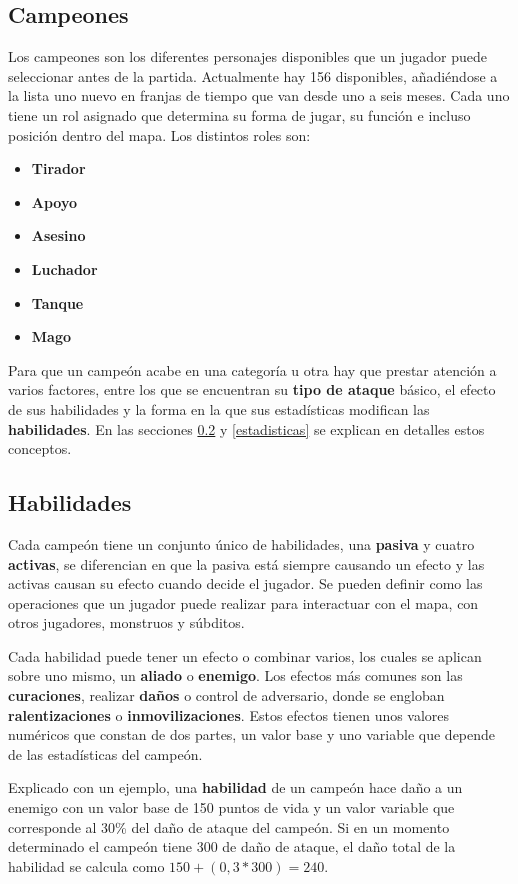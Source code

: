 \subsection{Campeones}
Los campeones son los diferentes personajes disponibles que un jugador puede seleccionar antes de la partida. Actualmente hay 156 disponibles, añadiéndose a la lista uno nuevo en franjas de tiempo que van desde uno a seis meses. Cada uno tiene un rol asignado que determina su forma de jugar, su función e incluso posición dentro del mapa. Los distintos roles son:
\begin{itemize}
	\tightlist
	\item \textbf{Tirador}
	\item \textbf{Apoyo}
	\item \textbf{Asesino}
	\item \textbf{Luchador}
	\item \textbf{Tanque}
	\item \textbf{Mago}
\end{itemize}

Para que un campeón acabe en una categoría u otra hay que prestar atención a varios factores, entre los que se encuentran su \textbf{tipo de ataque} básico, el efecto de sus habilidades y la forma en la que sus estadísticas modifican las \textbf{habilidades}. En las secciones \ref{habilidades} y \ref{estadisticas} se explican en detalles estos conceptos.

\subsection{Habilidades}
\label{habilidades}
Cada campeón tiene un conjunto único de habilidades, una \textbf{pasiva} y cuatro \textbf{activas}, se diferencian en que la pasiva está siempre causando un efecto y las activas causan su efecto cuando decide el jugador. Se pueden definir como las operaciones que un jugador puede realizar para interactuar con el mapa, con otros jugadores, monstruos y súbditos.

Cada habilidad puede tener un efecto o combinar varios, los cuales se aplican sobre uno mismo, un \textbf{aliado} o \textbf{enemigo}. Los efectos más comunes son las \textbf{curaciones}, realizar \textbf{daños} o control de adversario, donde se engloban \textbf{ralentizaciones} o \textbf{inmovilizaciones}. Estos efectos tienen unos valores numéricos que constan de dos partes, un valor base y uno variable que depende de las estadísticas del campeón.

Explicado con un ejemplo, una \textbf{habilidad} de un campeón hace daño a un enemigo con un valor base de 150 puntos de vida y un valor variable que corresponde al 30\% del daño de ataque del campeón. Si en un momento determinado el campeón tiene 300 de daño de ataque, el daño total de la habilidad se calcula como $150 + (0,3 * 300) = 240$.

